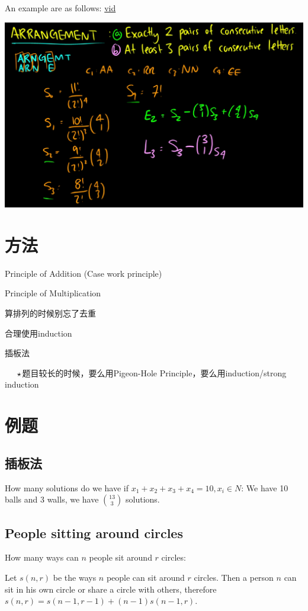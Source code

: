 \documentclass[12pt,a4paper]{ctexrep}
\begin{document}
An example are as follows:  \href{https://www.youtube.com/watch?v=D1T3xy_vtxU}{vid}

\begin{center}
\includegraphics[scale=0.3]{PIE_Example.png}
\end{center}

\section{方法}
Principle of Addition (Case work principle)

Principle of Multiplication

算排列的时候别忘了去重

合理使用induction

插板法

$\indent\star$题目较长的时候，要么用Pigeon-Hole Principle，要么用induction/strong induction

\section{例题}
\subsection{插板法}
How many solutions do we have if $x_1+x_2+x_3+x_4 = 10, x_i \in N$: We have 10 balls and 3 walls, we have $\binom{13}{3}$ solutions.

\subsection{People sitting around circles}
How many ways can $n$ people sit around $r$ circles: 

Let $s(n,r)$ be the ways $n$ people can sit around $r$ circles. Then a person $n$ can sit in his own circle or share a circle with others, therefore $s(n,r) = s(n-1,r-1)+(n-1)s(n-1,r)$.
\end{document}

